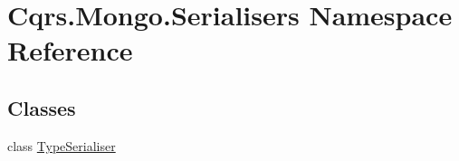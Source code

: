 \hypertarget{namespaceCqrs_1_1Mongo_1_1Serialisers}{}\section{Cqrs.\+Mongo.\+Serialisers Namespace Reference}
\label{namespaceCqrs_1_1Mongo_1_1Serialisers}
\subsection*{Classes}
\begin{DoxyCompactItemize}
\item 
class \hyperlink{classCqrs_1_1Mongo_1_1Serialisers_1_1TypeSerialiser}{Type\+Serialiser}
\end{DoxyCompactItemize}
